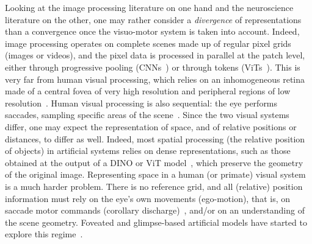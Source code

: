 \documentclass{article}
\begin{document}
Looking at the image processing literature on one hand and the neuroscience literature on the other, one may rather consider a \emph{divergence} of representations than a convergence once the visuo-motor system is taken into account.
Indeed, image processing operates on complete scenes made up of regular pixel grids (images or videos), and the pixel data is processed in parallel at the patch level, either through progressive pooling (CNNs~\cite{lecun1998gradient,krizhevsky2012imagenet}) or through tokens (ViTs~\cite{dosovitskiy2021image}). This is very far from human visual processing, which relies on an inhomogeneous retina made of a central fovea of very high resolution and peripheral regions of low resolution~\cite{curcio1990human}. Human visual processing is also sequential: the eye performs saccades, sampling specific areas of the scene~\cite{yarbus1967eye,findlay2003active}. Since the two visual systems differ, one may expect the representation of space, and of relative positions or distances, to differ as well. Indeed, most spatial processing (the relative position of objects) in artificial systems relies on dense representations, such as those obtained at the output of a DINO or ViT model~\cite{caron2021emerging,oquab2024dinov2}, which preserve the geometry of the original image. Representing space in a human (or primate) visual system is a much harder problem. There is no reference grid, and all (relative) position information must rely on the eye's own movements (ego-motion), that is, on saccade motor commands (corollary discharge)~\cite{duhamel1992updating,sommer2002pathway,wurtz2008neuronal}, and/or on an understanding of the scene geometry. Foveated and glimpse-based artificial models have started to explore this regime~\cite{mnih2014recurrent,cheung2016emergence,dauce2018active,dauce2020dual,jeremie2026foveated,ghaemi2026seq,immonen2026action}.
\end{document}
